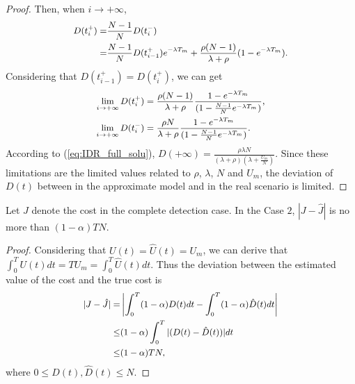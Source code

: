 \begin{proof}
Then, when $i \rightarrow +\infty$,
\begin{equation}
\begin{small}
\nonumber
\begin{aligned}
D(t_{i}^{+}) =& \frac{N-1}{N} D(t_{i}^{-}) \\
=& \frac{N-1}{N} D(t_{i-1}^{+}) e^{-\lambda T_{m}}
+ \frac{\rho (N-1)}{\lambda + \rho} (1 - e^{-\lambda T_{m}}).
\end{aligned}
\end{small}
\end{equation}
Considering that $D(t_{i-1}^{+}) = D(t_{i}^{+})$, we can get
\begin{equation}
\begin{small}
\nonumber
\begin{aligned}
\lim_{i \rightarrow +\infty} D(t_{i}^{+}) &=
\frac{\rho(N-1)}{\lambda+\rho} \frac{1 - e^{-\lambda T_{m}}}
{(1 - \frac{N-1}{N}e^{-\lambda T_{m}})}, \\
\lim_{i \rightarrow +\infty} D(t_{i}^{-}) &=
\frac{\rho N}{\lambda+\rho} \frac{1 - e^{-\lambda T_{m}}}
{(1 - \frac{N-1}{N}e^{-\lambda T_{m}})}. \\
\end{aligned}
\end{small}
\end{equation}
According to (\ref{eq:IDR_full_solu}),
$D(+\infty) = \frac{\rho \lambda N}
{(\lambda + \rho)(\lambda + \frac{U_{m}}{N})}$.
Since these limitations are the limited values related to
$\rho$, $\lambda$, $N$ and $U_{m}$,
the deviation of $D(t)$ between in the approximate model
and in the real scenario is limited.
\end{proof}

\begin{lem}\label{lem:Jnear}
Let $J$ denote the cost in the complete detection case.
In the Case $2$,
$|J - \hat{J}|$ is no more than $(1-\alpha) T N$.
\end{lem}
\begin{proof}
Considering that $U(t) = \hat{U}(t) = U_{m}$,
we can derive that $\int_{0}^{T} U(t) dt = T U_{m} 
= \int_{0}^{T} \hat{U}(t) dt $.
Thus the deviation between the estimated value of the cost and the true cost is
\begin{equation}
\begin{small}
\label{eq:delta_J}
\begin{aligned}
|J - \hat{J}| = & \left| \int_{0}^{T} (1-\alpha)D(t) dt
- \int_{0}^{T} (1-\alpha) \hat{D}(t) dt \right| \\
\le & (1-\alpha) \int_{0}^{T} |(D(t)-\hat{D}(t))| dt \\
\le & (1-\alpha) T N,
\end{aligned}
\end{small}
\end{equation}
where $0 \le D(t), \hat{D}(t) \le N$.
\end{proof}

